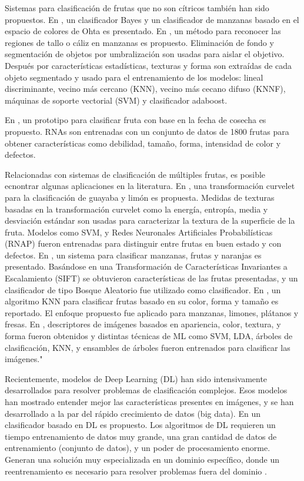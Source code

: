 \documentclass[twoside,spanish,ESP,MSc]{plantillaLabUPV}
\theoremstyle{definition}
\begin{document}
Sistemas para clasificación de frutas que no son cítricos también han sido propuestos. En \cite{rgbhisto}, un clasificador Bayes y un clasificador de manzanas basado en el espacio de colores de Ohta es presentado. En \cite{UNAY2007597}, un método para reconocer las regiones de tallo o cáliz en manzanas es propuesto. Eliminación de fondo y segmentación de objetos por umbralización son usadas para aislar el objetivo. Después por características estadísticas, texturas y forma son extraídas de cada objeto segmentado y usado para el entrenamiento de los modelos: lineal discriminante, vecino más cercano (KNN), vecino más cecano difuso (KNNF), máquinas de soporte vectorial (SVM) y clasificador adaboost.

En \cite{ALOHALI201129}, un prototipo para clasificar fruta con base en la fecha de cosecha es propuesto. RNAs son entrenadas con un conjunto de datos de 1800 frutas para obtener características como debilidad, tamaño, forma, intensidad de color y defectos.

Relacionadas con sistemas de clasificación de múltiples frutas, es posible ecnontrar algunas aplicaciones en la literatura. En \cite{khoje}, una transformación curvelet para la clasificación de guayaba y limón es propuesta. Medidas de texturas basadas en la transformación curvelet como la energía, entropía, media y desviación estándar son usadas para caracterizar la textura de la superficie de la fruta. Modelos como SVM, y Redes Neuronales Artificiales Probabilísticas (RNAP) fueron entrenadas para distinguir entre frutas en buen estado y con defectos. En \cite{7086191}, un sistema para clasificar manzanas, frutas y naranjas es presentado. Basándose en una Transformación de Características Invariantes a Escalamiento (SIFT) se obtuvieron características de las frutas presentadas, y un clasificador de tipo Bosque Aleatorio fue utilizado como clasificador. En \cite{5254804},  un algoritmo KNN para clasificar frutas basado en su color, forma y tamaño es reportado. El enfoque propuesto fue aplicado para manzanas, limones, plátanos y fresas. En  \cite{ROCHA201096}, descriptores de imágenes basados en apariencia, color, textura, y forma fueron obtenidos y distintas técnicas de ML como SVM, LDA, árboles de clasificación, KNN, y ensambles de árboles fueron entrenados para clasificar las imágenes."




Recientemente, modelos de Deep Learning (DL) han sido intensivamente desarrollados para resolver problemas de clasificación complejos. Esos modelos han mostrado entender mejor las características presentes en imágenes, y se han desarrollado a la par del rápido crecimiento de datos (big data). En \cite{8488544} un clasificador basado en DL es propuesto. Los algoritmos de DL requieren un tiempo entrenamiento de datos muy grande, una gran cantidad de datos de entrenamiento (conjunto de datos), y un poder de procesamiento enorme. Generan una solución muy especializada en un dominio específico, donde un reentrenamiento es necesario para resolver problemas fuera del dominio \cite{dptarda}.
\end{document}
